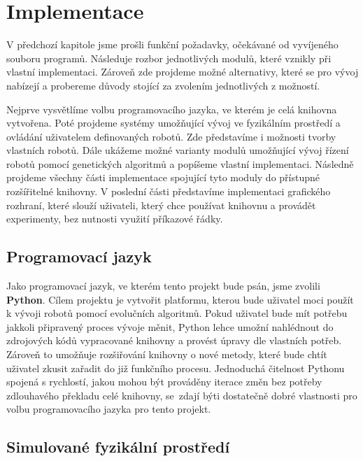 
\chapter{Implementace}
V předchozí kapitole jsme prošli funkční požadavky, očekávané od vyvíjeného
souboru programů. Následuje rozbor jednotlivých modulů, které vznikly při
vlastní implementaci. Zároveň zde projdeme možné alternativy, které se pro
vývoj nabízejí a probereme důvody stojící za zvolením jednotlivých z možností.

Nejprve vysvětlíme volbu programovacího jazyka, ve kterém je celá knihovna
vytvořena. Poté projdeme systémy umožňující vývoj ve fyzikálním prostředí a
ovládání uživatelem definovaných robotů. Zde představíme i možnosti tvorby
vlastních robotů. Dále ukážeme možné varianty modulů umožňující vývoj řízení
robotů pomocí genetických algoritmů a popíšeme vlastní implementaci. Následně
projdeme všechny části implementace spojující tyto moduly do přístupné
rozšířitelné knihovny. V poslední části představíme implementaci grafického
rozhraní, které slouží uživateli, který chce používat knihovnu a provádět
experimenty, bez nutnosti využití příkazové řádky.

\section{Programovací jazyk}

Jako programovací jazyk, ve kterém tento projekt bude psán, jsme zvolili\\
\textbf{Python}. Cílem projektu je vytvořit platformu, kterou bude uživatel
moci použít k vývoji robotů pomocí evolučních algoritmů. Pokud uživatel bude
mít potřebu jakkoli připravený proces vývoje měnit, Python lehce umožní
nahlédnout do zdrojových kódů vypracované knihovny a provést úpravy dle
vlastních potřeb. Zároveň to umožňuje rozšiřování knihovny o nové metody, které
bude chtít uživatel zkusit zařadit do již funkčního procesu. Jednoduchá
čitelnost Pythonu spojená s rychlostí, jakou mohou být prováděny iterace změn
bez potřeby zdlouhavého překladu celé knihovny, se~zdají býti dostatečně dobré
vlastnosti pro volbu programovacího jazyka pro tento projekt.

\section{Simulované fyzikální prostředí}

